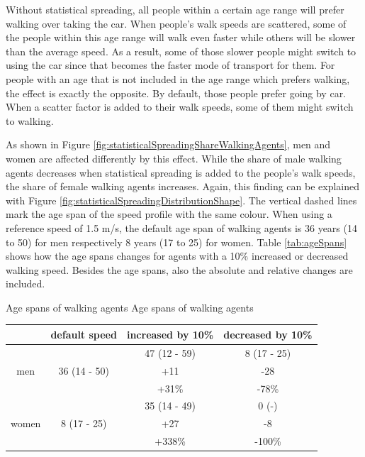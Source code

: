 Without statistical spreading, all people within a certain age range will prefer walking over taking the car. When people's walk speeds are scattered, some of the people within this age range will walk even faster while others will be slower than the average speed. As a result, some of those slower people might switch to using the car since that becomes the faster mode of transport for them. For people with an age that is not included in the age range which prefers walking, the effect is exactly the opposite. By default, those people prefer going by car. When a scatter factor is added to their walk speeds, some of them might switch to walking.

As shown in Figure \ref{fig:statisticalSpreadingShareWalkingAgents}, men and women are affected differently by this effect. While the share of male walking agents decreases when statistical spreading is added to the people's walk speeds, the share of female walking agents increases. Again, this finding can be explained with Figure \ref{fig:statisticalSpreadingDistributionShape}. The vertical dashed lines mark the age span of the speed profile with the same colour.  When using a reference speed of 1.5 m/s, the default age span of walking agents is 36 years (14 to 50) for men respectively 8 years (17 to 25) for women. Table \ref{tab:ageSpans} shows how the age spans changes for agents with a 10\% increased or decreased walking speed. Besides the age spans, also the absolute and relative changes are included.

\createtable%
{Age spans of walking agents}%
{Age spans of walking agents}%
{\label{tab:ageSpans}}%
{%
    \begin{tabular}{c|c|c|c}
       & default speed & increased by 10\% & decreased by 10\% \\
    \midrule
    \multirow{3}[0]{*}{men} & \multirow{3}[0]{*}{36 (14 - 50)} & 47 (12 - 59) & 8 (17 - 25) \\
          &       & +11   & -28 \\
          &       & +31\%  & -78\% \\
    \midrule
    \multirow{3}[0]{*}{women} & \multirow{3}[0]{*}{8 (17 - 25)} & 35 (14 - 49) & 0 (-) \\
          &       & +27   & -8 \\
          &       & +338\% & -100\% \\
    \end{tabular}%
}%
{}

